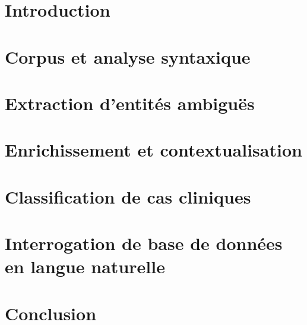 \section{Introduction}
\label{sec:tal:intro}


\section{Corpus et analyse syntaxique}
\label{sec:tal:syntax}


\section{Extraction d'entités ambiguës}
\label{sec:tal:entity}


\section{Enrichissement et contextualisation}
\label{sec:tal:ctx}


\section{Classification de cas cliniques}
\label{sec:tal:classification}


\section{Interrogation de base de données en langue naturelle}
\label{sec:tal:nl-query}


\section{Conclusion}
\label{sec:tal:conclusion}

